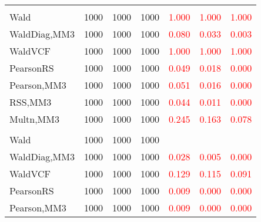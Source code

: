 \documentclass[
]{article}
\begin{document}
\begin{table}[H]
{\begin{tabular}[t]{lrrrrrr}
\addlinespace[0.3em]
\multicolumn{7}{l}{\textbf{1F 8V}}\\
\hspace{1em}Wald & 1000 & 1000 & 1000 & \textcolor{red}{1.000} & \textcolor{red}{1.000} & \vphantom{1} \textcolor{red}{1.000}\\
\hspace{1em}WaldDiag,MM3 & 1000 & 1000 & 1000 & \textcolor{red}{0.080} & \textcolor{red}{0.033} & \textcolor{red}{0.003}\\
\hspace{1em}WaldVCF & 1000 & 1000 & 1000 & \textcolor{red}{1.000} & \textcolor{red}{1.000} & \textcolor{red}{1.000}\\
\hspace{1em}PearsonRS & 1000 & 1000 & 1000 & \textcolor{red}{0.049} & \textcolor{red}{0.018} & \textcolor{red}{0.000}\\
\hspace{1em}Pearson,MM3 & 1000 & 1000 & 1000 & \textcolor{red}{0.051} & \textcolor{red}{0.016} & \textcolor{red}{0.000}\\
\hspace{1em}RSS,MM3 & 1000 & 1000 & 1000 & \textcolor{red}{0.044} & \textcolor{red}{0.011} & \textcolor{red}{0.000}\\
\hspace{1em}Multn,MM3 & 1000 & 1000 & 1000 & \textcolor{red}{0.245} & \textcolor{red}{0.163} & \textcolor{red}{0.078}\\
\addlinespace[0.3em]
\multicolumn{7}{l}{\textbf{1F 15V}}\\
\hspace{1em}Wald & 1000 & 1000 & 1000 & \textcolor{black}{} & \textcolor{black}{} & \vphantom{1} \textcolor{black}{}\\
\hspace{1em}WaldDiag,MM3 & 1000 & 1000 & 1000 & \textcolor{red}{0.028} & \textcolor{red}{0.005} & \textcolor{red}{0.000}\\
\hspace{1em}WaldVCF & 1000 & 1000 & 1000 & \textcolor{red}{0.129} & \textcolor{red}{0.115} & \textcolor{red}{0.091}\\
\hspace{1em}PearsonRS & 1000 & 1000 & 1000 & \textcolor{red}{0.009} & \textcolor{red}{0.000} & \textcolor{red}{0.000}\\
\hspace{1em}Pearson,MM3 & 1000 & 1000 & 1000 & \textcolor{red}{0.009} & \textcolor{red}{0.000} & \textcolor{red}{0.000}\\

\end{tabular}}
\end{table}
\end{document}
